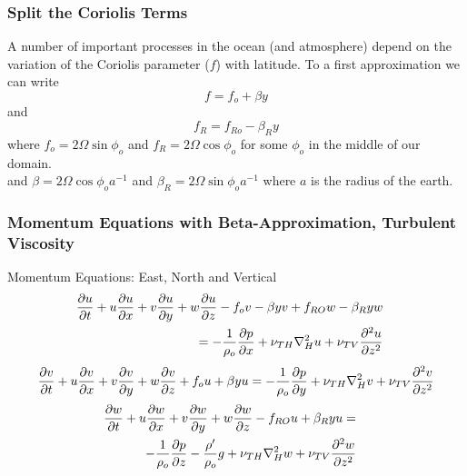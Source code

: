 \documentclass[xcolor=dvipsnames]{beamer}
\begin{document}
\begin{frame}
  \frametitle{Split the Coriolis Terms}

A number of important processes in the ocean (and atmosphere) depend on the variation of the Coriolis parameter ($f$) with latitude.  To a first approximation we can write
\[ f = f_o + \beta y\]
and 
\[ f_R = f_{Ro} - \beta_R y\]
where $f_o = 2 \Omega \sin \phi_o$ and $f_R = 2 \Omega \cos \phi_o$ for some $\phi_o$ in the middle of our domain.\\
and
$\beta = 2 \Omega \cos \phi_o a^{-1}$ and $\beta_R = 2 \Omega \sin \phi_o a^{-1}$ where $a$ is the radius of the earth.
\end{frame}

\begin{frame}
  \frametitle{Momentum Equations with Beta-Approximation, Turbulent Viscosity}   %
Momentum Equations: East, North and Vertical\\



\begin{eqnarray*} \frac {\partial u}{\partial t} + u \frac {\partial u}{\partial x} + v \frac {\partial u}{\partial y} + w \frac {\partial u}{\partial z} -f_o v - \beta y v +f_{RO} w - \beta_R y w &&\\
= -\frac{1}{\rho_o} \frac {\partial p}{\partial x} + \nu_{TH} \nabla_H^2 u + \nu_{TV}\frac{\partial^2 u}{\partial z^2}&&
\end{eqnarray*} 
\[ \frac {\partial v}{\partial t} + u \frac {\partial v}{\partial x} + v \frac {\partial v}{\partial y} + w\frac {\partial v}{\partial z} + f_o u + \beta y u = -\frac{1}{\rho_o} \frac {\partial p}{\partial y} + \nu_{TH} \nabla_H^2 v + \nu_{TV}\frac{\partial^2 v}{\partial z^2}\]
\begin{eqnarray*}
\frac {\partial w}{\partial t} + u \frac {\partial w}{\partial x} + v \frac {\partial w}{\partial y} + w \frac {\partial w}{\partial z} - f_{RO} u + \beta_R y u = &&\\
-\frac{1}{\rho_o} \frac {\partial p}{\partial z} - \frac{\rho^\prime}{\rho_o}g + \nu_{TH} \nabla_H^2 w + \nu_{TV}\frac{\partial^2 w}{\partial z^2} &&
\end{eqnarray*}



\end{frame}



\end{document}
